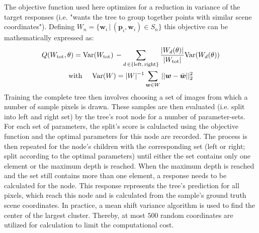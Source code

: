 \documentclass[final]{cvpr}
\begin{document}
The objective function used here optimizes for a reduction in variance of the target 
responses (i.e. "wants the tree to group together points with similar scene coordinates").
Defining $W_n = \{ \boldsymbol{w}_i \, | \, (\boldsymbol{p}_i, \boldsymbol{w}_i) \in S_n \}$ this
objective can be mathematically expressed as:
\begin{multline}
	Q(W_\text{tot}, \theta) =
		\text{Var}(W_\text{tot})\, - \sum_{d\,\in\{\text{left,\,right}\}}
			\dfrac{|W_d(\theta)|}{|W_\text{tot}|} \text{Var}(W_d(\theta))\\
	\text{with} \hspace{5mm} \text{Var}(W) = |W|^{-1} \sum_{\boldsymbol{w}\in W} ||\boldsymbol{w} - \bar{\boldsymbol{w}}||_2^2
\end{multline}
Training the complete tree then involves choosing a set of images from which a number
of sample pixels is drawn. These samples are then evaluated (i.e. split into left and right set)
by the tree's root node for a number of parameter-sets. For each set of parameters, the
split's score is calulacted using the objective function and the optimal parameters for
this node are recorded. The process is then repeated for the node's children with the corresponding
set (left or right; split according to the optimal parameters) until either the set contains
only one element or the maximum depth is reached.
When the maximum depth is reached and the set still contains more than one element, a response
needs to be calculated for the node. This response represents the tree's prediction for 
all pixels, which reach this node and is calculated from the sample's ground truth scene coordinates.
In practice, a mean shift variance algorithm \cite{Comaniciu2002} is used to find the center of the 
largest cluster. Thereby, at most $500$ random coordinates are utilized for calculation to limit 
the computational cost.
\end{document}

